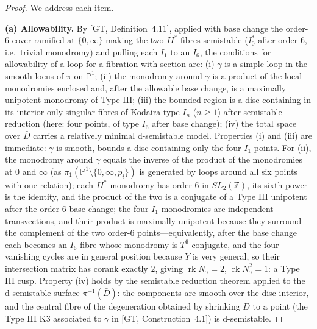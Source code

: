 \documentclass[11pt]{article}
\newcommand{\PP}{\mathbb{P}}
\newcommand{\bZ}{\mathbb{Z}}
\DeclareMathOperator{\rk}{rk}
\begin{document}
\begin{proof}
We address each item.

\textbf{(a) Allowability.} By [GT, Definition~4.11], applied with base
change the order-$6$ cover ramified at $\{0,\infty\}$ making the two $II^*$
fibres semistable ($I_0^*$ after order $6$, i.e.\ trivial monodromy) and
pulling each $I_1$ to an $I_6$, the conditions for allowability of a loop
for a fibration with section are: (i) $\gamma$ is a simple loop in the
smooth locus of $\pi$ on $\PP^1$; (ii) the monodromy around $\gamma$ is a
product of the local monodromies enclosed and, after the allowable base
change, is a maximally unipotent monodromy of Type III; (iii) the bounded
region is a disc containing in its interior only singular fibres of Kodaira
type $I_n$ ($n\ge1$) after semistable reduction (here: four points, of type
$I_6$ after base change); (iv) the total space over $\bar D$ carries a
relatively minimal d-semistable model. Properties (i) and (iii) are
immediate: $\gamma$ is smooth, bounds a disc containing only the four
$I_1$-points. For (ii), the monodromy around $\gamma$ equals the inverse of
the product of the monodromies at $0$ and $\infty$ (as
$\pi_1(\PP^1\setminus\{0,\infty,p_i\})$ is generated by loops around all
six points with one relation); each $II^*$-monodromy has order $6$ in
$SL_2(\bZ)$, its sixth power is the identity, and the product of the two is
a conjugate of a Type III unipotent after the order-$6$ base change; the
four $I_1$-monodromies are independent transvections, and their product is
maximally unipotent because they surround the complement of the two
order-$6$ points---equivalently, after the base change each becomes an
$I_6$-fibre whose monodromy is $T^6$-conjugate, and the four vanishing
cycles are in general position because $Y$ is very general, so their
intersection matrix has corank exactly $2$, giving $\rk N_\gamma =
2$, $\rk N_\gamma^2 = 1$: a Type III cusp. Property (iv) holds by the
semistable reduction theorem applied to the d-semistable surface
$\pi^{-1}(\bar D)$: the components are smooth over the disc interior, and
the central fibre of the degeneration obtained by shrinking $D$ to a point
(the Type III K3 associated to $\gamma$ in [GT, Construction~4.1]) is
d-semistable.



\end{proof}
\end{document}
